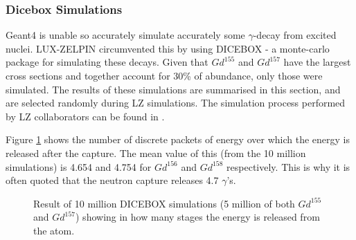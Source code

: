 \subsubsection{Dicebox Simulations}
\par
Geant4 is unable so accurately simulate accurately some $\gamma$-decay from excited nuclei.
LUX-ZELPIN circumvented this by using DICEBOX - a monte-carlo package for simulating these decays.
Given that $Gd^{155}$ and $Gd^{157}$ have the largest cross sections and together account for 30\% of abundance, only those were simulated.
The results of these simulations are summarised in this section, and are selected randomly during LZ simulations.
The simulation process performed by LZ collaborators can be found in \cite{ucsb_gdls_dicebox_simulations_ref}.

\par
Figure \ref{fig:Gd_capture_resulting_particle_count} shows the number of discrete packets of energy over which the energy is released after the capture.
The mean value of this (from the 10 million simulations) is 4.654 and 4.754 for $Gd^{156}$ and $Gd^{158}$ respectively.
This is why it is often quoted that the neutron capture releases 4.7 $\gamma$'s.

\begin{figure}[!htbp]
    \centering
    \caption{Result of 10 million DICEBOX simulations (5 million of both $Gd^{155}$ and $Gd^{157}$) showing in how many stages the energy is released from the atom.}
    \label{fig:Gd_capture_resulting_particle_count}
\end{figure}

